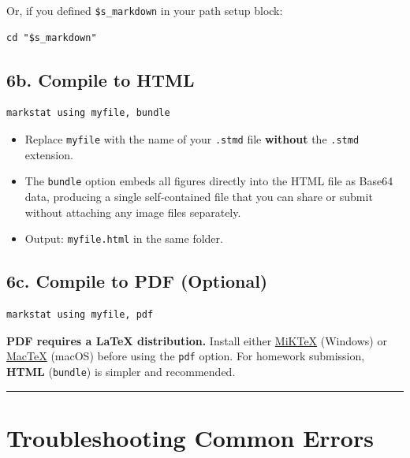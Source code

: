 \documentclass[paper=a4, fontsize=11pt]{scrartcl}
\newcommand{\horrule}[1]{\rule{\linewidth}{#1}}
\begin{document}
Or, if you defined \texttt{\$s\_markdown} in your path setup block:

\begin{lstlisting}[style=stata]
cd "$s_markdown"
\end{lstlisting}

\subsection*{6b. Compile to HTML}

\begin{lstlisting}[style=stata]
markstat using myfile, bundle
\end{lstlisting}

\begin{itemize}
  \item Replace \texttt{myfile} with the name of your \texttt{.stmd} file
        \textbf{without} the \texttt{.stmd} extension.
  \item The \texttt{bundle} option embeds all figures directly into the HTML file as
        Base64 data, producing a single self-contained file that you can share or
        submit without attaching any image files separately.
  \item Output: \texttt{myfile.html} in the same folder.
\end{itemize}

\subsection*{6c. Compile to PDF (Optional)}

\begin{lstlisting}[style=stata]
markstat using myfile, pdf
\end{lstlisting}

\begin{warnbox}
\textbf{PDF requires a \LaTeX{} distribution.} Install either
\href{https://miktex.org}{MiKTeX} (Windows) or
\href{https://tug.org/mactex/}{MacTeX} (macOS) before using the \texttt{pdf} option.
For homework submission, \textbf{HTML} (\texttt{bundle}) is simpler and recommended.
\end{warnbox}

\bigskip\horrule{0.4pt}\bigskip

\section{Troubleshooting Common Errors}
\end{document}
